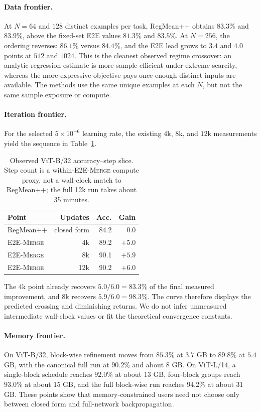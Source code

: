 \documentclass[letterpaper]{article} %
\newcommand{\method}{\textup{\textsc{E2E-Merge}}\xspace}
\theoremstyle{plain}
\theoremstyle{definition}
\begin{document}
\paragraph{Data frontier.}
At $N=64$ and $128$ distinct examples per task, RegMean++ obtains $83.3\%$ and $83.9\%$, above the fixed-set E2E values $81.3\%$ and $83.5\%$.
At $N=256$, the ordering reverses: $86.1\%$ versus $84.4\%$, and the E2E lead grows to $3.4$ and $4.0$ points at $512$ and $1024$.
This is the cleanest observed regime crossover: an analytic regression estimate is more sample efficient under extreme scarcity, whereas the more expressive objective pays once enough distinct inputs are available.
The methods use the same unique examples at each $N$, but not the same sample exposure or compute.

\paragraph{Iteration frontier.}
For the selected $5\times10^{-6}$ learning rate, the existing $4$k, $8$k, and $12$k measurements yield the sequence in Table~\ref{tab:step-increments}.
\begin{table}[tb]
\centering
\small
\setlength{\tabcolsep}{4pt}
\begin{tabular*}{\columnwidth}{@{\extracolsep{\fill}}lrrr}
\toprule
Point & Updates & Acc. & Gain \\
\midrule
RegMean++ & closed form & 84.2 & 0.0 \\
\method & 4k & 89.2 & $+5.0$ \\
\method & 8k & 90.1 & $+5.9$ \\
\method & 12k & 90.2 & $+6.0$ \\
\bottomrule
\end{tabular*}
\caption{Observed ViT-B/32 accuracy--step slice. Step count is a within-\method compute
proxy, not a wall-clock match to RegMean++; the full 12k run takes about 35 minutes.}
\label{tab:step-increments}
\end{table}
The $4$k point already recovers $5.0/6.0=83.3\%$ of the final measured improvement, and $8$k recovers $5.9/6.0=98.3\%$.
The curve therefore displays the predicted crossing and diminishing returns.
We do not infer unmeasured intermediate wall-clock values or fit the theoretical convergence constants.

\paragraph{Memory frontier.}
On ViT-B/32, block-wise refinement moves from $85.3\%$ at $3.7$ GB to $89.8\%$ at $5.4$ GB, with the canonical full run at $90.2\%$ and about $8$ GB.
On ViT-L/14, a single-block schedule reaches $92.0\%$ at about $13$ GB, four-block groups reach $93.0\%$ at about $15$ GB, and the full block-wise run reaches $94.2\%$ at about $31$ GB.
These points show that memory-constrained users need not choose only between closed form and full-network backpropagation.
\end{document}

